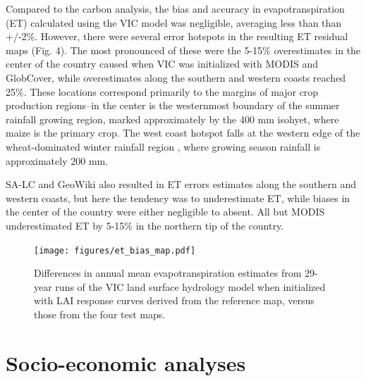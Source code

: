 \documentclass{pnastwo}
\begin{document}
\begin{article}
Compared to the carbon analysis, the bias and accuracy in evapotranspiration (ET) calculated using the VIC model was negligible, averaging less than than +/-2\%. However, there were several error hotspots in the resulting ET residual maps (Fig. 4). The most pronounced of these were the 5-15\% overestimates in the center of the country caused when VIC was initialized with MODIS and GlobCover, while overestimates along the southern and western coasts reached 25\%. These locations correspond primarily to the margins of major crop production regions--in the center is the westernmost boundary of the summer rainfall growing region, marked approximately by the 400 mm isohyet, where maize is the primary crop. The west coast hotspot falls at the western edge of the wheat-dominated winter rainfall region \cite{hardy_rainfed_2011}, where growing season rainfall is approximately 200 mm. 

SA-LC and GeoWiki also resulted in ET errors estimates along the southern and western coasts, but here the tendency was to underestimate ET, while biases in the center of the country were either negligible to absent.  All but MODIS underestimated ET by 5-15\% in the northern tip of the country.  



\vspace{-0.75 cm}
\begin{figure}[h]
\centerline{\texttt{[image: figures/et\_bias\_map.pdf]}}
\caption{Differences in annual mean evapotranspiration estimates from 29-year runs of the VIC land surface hydrology model when initialized with LAI response curves derived from the reference map, versus those from the four test maps.}\label{afoto}
\end{figure}

\section{Socio-economic analyses}

\end{article}
\end{document}
